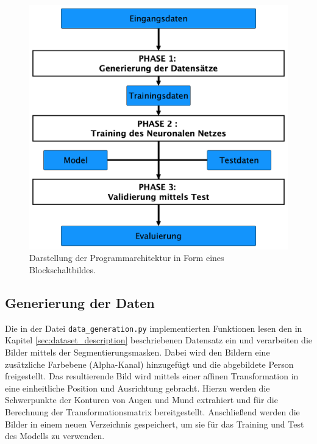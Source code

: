 \documentclass[journal,twoside,web]{ieeecolor}
\begin{document}
\begin{figure}[H]
    \centerline{\includegraphics[width=\columnwidth]{Architekturv2.png}}
    \caption{Darstellung der Programmarchitektur in Form eines Blockschaltbildes.}
    \label{fig:architecture}
\end{figure}

\subsection{Generierung der Daten}
Die in der Datei \texttt{data\_generation.py} implementierten Funktionen lesen den in Kapitel \ref{sec:dataset_description} beschriebenen Datensatz ein und verarbeiten die Bilder mittels der Segmentierungsmasken. Dabei wird den Bildern eine zusätzliche Farbebene (Alpha-Kanal) hinzugefügt und die abgebildete Person freigestellt. Das resultierende Bild wird mittels einer affinen Transformation in eine einheitliche Position und Ausrichtung gebracht. Hierzu werden die Schwerpunkte der Konturen von Augen und Mund extrahiert und für die Berechnung der Transformationsmatrix bereitgestellt. Anschließend werden die Bilder in einem neuen Verzeichnis gespeichert, um sie für das Training und Test des Modells zu verwenden. %
\end{document}
